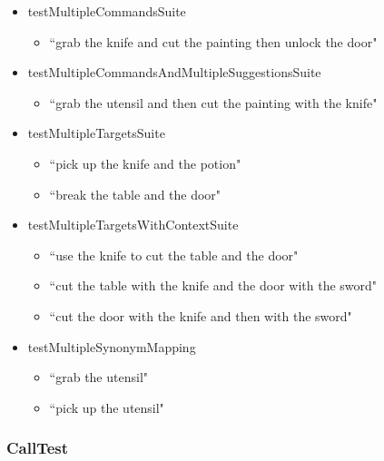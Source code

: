 \documentclass[11pt]{article}
\begin{document}
\begin{appendices}
\begin{scriptsize}
\begin{itemize}
\begin{itemize}
	\end{itemize}
\item testMultipleCommandsSuite
	\begin{itemize}
	\item ``grab the knife and cut the painting then unlock the door"
	\end{itemize}
\item testMultipleCommandsAndMultipleSuggestionsSuite
	\begin{itemize}
	\item ``grab the utensil and then cut the painting with the knife"
	\end{itemize}
\item testMultipleTargetsSuite
	\begin{itemize}
	\item ``pick up the knife and the potion"
	\item ``break the table and the door"
	\end{itemize}
\item testMultipleTargetsWithContextSuite
	\begin{itemize}
	\item ``use the knife to cut the table and the door"
	\item ``cut the table with the knife and the door with the sword"
	\item ``cut the door with the knife and then with the sword"
	\end{itemize}
\item testMultipleSynonymMapping
	\begin{itemize}
	\item ``grab the utensil"
	\item ``pick up the utensil"
	\end{itemize}
\end{itemize}
\end{scriptsize}

\subsubsection{CallTest}


\end{appendices}
\end{document}
